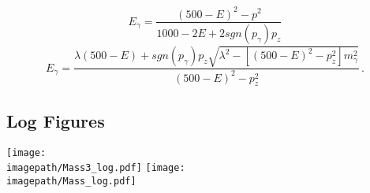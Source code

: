 \begin{equation}
  {E}_{\gamma} = \frac{ {(500 - E)}^2 - {p}^{2}}{1000 -2 E + 2sgn({p}_{\gamma}) {p}_{z}}
     \end{equation}
\begin{equation}
 {E}_{\gamma} = \frac{{\lambda}(500 - E) + sgn({p}_{\gamma}) {p}_{z}\sqrt{ {\lambda}^{2} - [{(500 - E)}^{2} -   {p}_{z}^{2}]{m}_{\gamma}^{2}}}{{(500 - E)}^{2} -   {p}_{z}^{2}}\, .
     \end{equation}

\subsection{Log Figures}
\label{App:LogFigures}
\texttt{[image: \\imagepath/Mass3\_log.pdf]}
\texttt{[image: \\imagepath/Mass\_log.pdf]}
